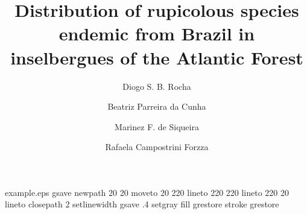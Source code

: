 %
%
%
%
%
\begin{filecontents*}{example.eps}
gsave
newpath
  20 20 moveto
  20 220 lineto
  220 220 lineto
  220 20 lineto
closepath
2 setlinewidth
gsave
  .4 setgray fill
grestore
stroke
grestore
\end{filecontents*}
%
\RequirePackage{fix-cm}
%
\documentclass[smallextended]{svjour3}       %
%
\smartqed  %
%
\usepackage[brazilian]{babel}
\usepackage[utf8]{inputenc}
\usepackage[T1]{fontenc}
\usepackage{natbib}
\usepackage{graphicx}

%
%
%
%
%


\title{Distribution of rupicolous species endemic from Brazil in inselbergues  of the Atlantic Forest %
}


\author{
        Diogo S. B. Rocha  \and
        Beatriz Parreira da Cunha  \and
        Marinez F. de Siqueira  \and
        Rafaela Campostrini Forzza
}


